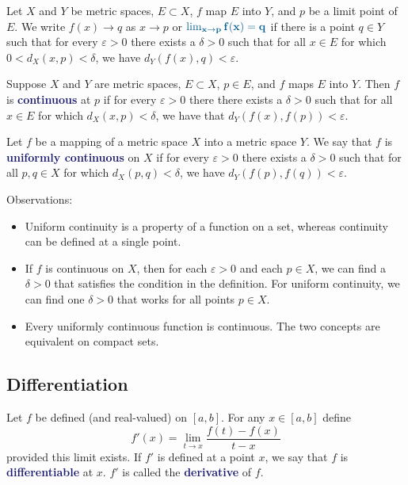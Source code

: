 \documentclass[11pt]{article}
\numberwithin{equation}{section}
\newcommand{\navy}[1]{\textcolor{MidnightBlue}{\bf #1}}
\theoremstyle{definition}
\theoremstyle{definition}
\newcommand{\1}{\mathbbm 1}
\def\d{\delta}
\newcommand{\e}{\varepsilon}
\begin{document}
\begin{definition}[Limit]
	Let $X$ and $Y$ be metric spaces, $E \subset X$, $f$ map $E$ into $Y$, and $p$ be a limit point of $E$. We write $f(x) \to q$ as $x \to p$ or $\navy{\lim_{x\to p} f(x) = q}$ if there is a point $q \in Y$ such that for every $\e > 0$ there exists a $\d > 0$ such that for all $x \in E$ for which $0 < d_X(x,p) < \d$, we have $d_Y(f(x),q) < \e$. 
\end{definition}

\begin{definition}[Continuous]
	Suppose $X$ and $Y$ are metric spaces, $E \subset X$, $p \in E$, and $f$ maps $E$ into $Y$. Then $f$ is \navy{continuous} at $p$ if for every $\e > 0$ there there exists a $\d > 0$ such that for all $x \in E$ for which $d_X(x,p) < \d$, we have that $d_Y(f(x), f(p)) < \e$. 
\end{definition}

\begin{definition}
	Let $f$ be a mapping of a metric space $X$ into a metric space $Y$. We say that $f$ is \navy{uniformly continuous} on $X$ if for every $\e > 0$ there exists a $\d > 0$ such that for all $p,q \in X$ for which $d_X(p,q) < \delta$, we have $d_Y(f(p),f(q)) < \e$. 
\end{definition}

Observations:
\begin{itemize}
	\item Uniform continuity is a property of a function on a set, whereas continuity can be defined at a single point. 
	\item If $f$ is continuous on $X$, then for each $\e > 0$ and each $p \in X$, we can find a $\d > 0$ that satisfies the condition in the definition. For uniform continuity, we can find one $\d > 0$ that works for all points $p \in X$. 
	\item Every uniformly continuous function is continuous. The two concepts are equivalent on compact sets. 
\end{itemize}

\subsection{Differentiation}

\begin{definition}
	Let $f$ be defined (and real-valued) on $[a,b]$. For any $x \in [a,b]$ define
	\begin{equation}
		f'(x) = \lim_{t \to x} \frac{f(t) - f(x)}{t - x}
	\end{equation}
	provided this limit exists. If $f'$ is defined at a point $x$, we say that $f$ is \navy{differentiable} at $x$. $f'$ is called the \navy{derivative} of $f$.  
\end{definition}
\end{document}
